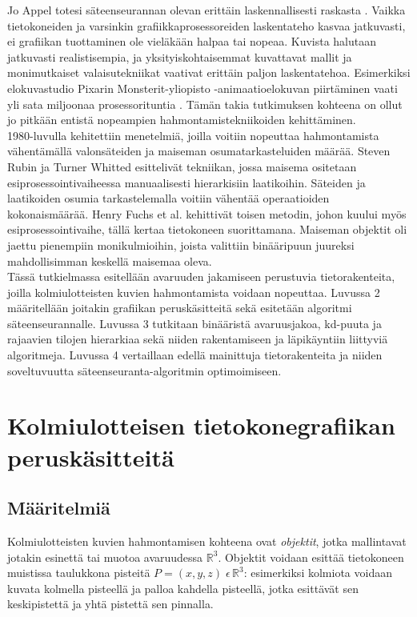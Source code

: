 \documentclass[a4paper, 12pt, titlepage]{article}
\newcommand{\R}{\mathbb{R}}
\begin{document}
Jo Appel totesi säteenseurannan olevan erittäin laskennallisesti raskasta \citep{appel}. Vaikka tietokoneiden ja varsinkin grafiikkaprosessoreiden laskentateho kasvaa jatkuvasti, ei grafiikan tuottaminen ole vieläkään halpaa tai nopeaa. Kuvista halutaan jatkuvasti realistisempia, ja yksityiskohtaisemmat kuvattavat mallit ja monimutkaiset valaisutekniikat vaativat erittäin paljon laskentatehoa. Esimerkiksi elokuvastudio Pixarin Monsterit-yliopisto -animaatioelokuvan piirtäminen vaati yli sata miljoonaa prosessorituntia \citep{monsterit}. Tämän takia tutkimuksen kohteena on ollut jo pitkään entistä nopeampien hahmontamistekniikoiden kehittäminen.\\

1980-luvulla kehitettiin menetelmiä, joilla voitiin nopeuttaa hahmontamista vähentämällä valonsäteiden ja maiseman osumatarkasteluiden määrää. Steven Rubin ja Turner Whitted esittelivät tekniikan, jossa maisema ositetaan esiprosessointivaiheessa manuaalisesti hierarkisiin laatikoihin. Säteiden ja laatikoiden osumia tarkastelemalla voitiin vähentää operaatioiden kokonaismäärää. \citep[.]{rubin} Henry Fuchs et al. kehittivät toisen metodin, johon kuului myös esiprosessointivaihe, tällä kertaa tietokoneen suorittamana. Maiseman objektit oli jaettu pienempiin monikulmioihin, joista valittiin binääripuun juureksi mahdollisimman keskellä maisemaa oleva.\\

Tässä tutkielmassa esitellään avaruuden jakamiseen perustuvia tietorakenteita, joilla kolmiulotteisten kuvien hahmontamista voidaan nopeuttaa. Luvussa 2 määritellään joitakin grafiikan peruskäsitteitä sekä esitetään algoritmi säteenseurannalle. Luvussa 3 tutkitaan binääristä avaruusjakoa, kd-puuta ja rajaavien tilojen hierarkiaa sekä niiden rakentamiseen ja läpikäyntiin liittyviä algoritmeja. Luvussa 4 vertaillaan edellä mainittuja tietorakenteita ja niiden soveltuvuutta säteenseuranta-algoritmin optimoimiseen.


\newpage
\section{Kolmiulotteisen tietokonegrafiikan peruskäsitteitä}
\subsection{Määritelmiä}

Kolmiulotteisten kuvien hahmontamisen kohteena ovat \emph{objektit}, jotka mallintavat jotakin esinettä tai muotoa avaruudessa $\R^3$. Objektit voidaan esittää tietokoneen muistissa taulukkona pisteitä $P=(x,y,z)\;\epsilon\,\R^3$: esimerkiksi kolmiota voidaan kuvata kolmella pisteellä ja palloa kahdella pisteellä, jotka esittävät sen keskipistettä ja yhtä pistettä sen pinnalla. \citep[.]{angel}\\
\end{document}
